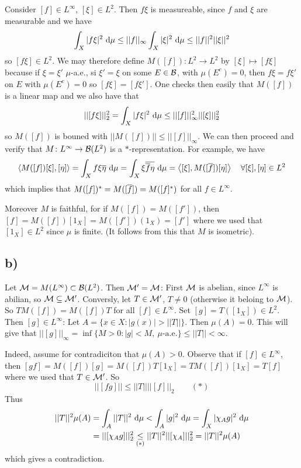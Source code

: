 \documentclass[10pt,english,a4paper]{article}
\theoremstyle{definition}
\def\Linf{L^{\infty}}
\begin{document}
Consider $[f] \in \Linf$, $[\xi] \in L^2$. Then $f\xi$ is measureable, since $f$
and $\xi$ are measurable and we have 
\[ \int_{X} |f\xi|^2 ~\text{d}\mu \leq ||f||_{\infty} \int_{X}|\xi|^2 ~\text{d} \mu 
\leq ||f||^2 ||\xi||^2\]
so $[f\xi] \in L^2$.
We may therefore define $M([f])\colon L^2 \to L^2$ by $[\xi]\mapsto [f\xi]$ 
because if $\xi = \xi'$ $\mu$-a.e., si $\xi'=\xi$ on some $E \in \mathcal{B}$, 
with $\mu(E^c) =0$, then $f\xi = f\xi'$ on $E$ with $\mu(E^c)=0$ so 
$[f\xi] = [f\xi']$. One checks then easily that $M([f])$ is a linear map
and we also have that 
\[
||[f\xi]||_{2}^{2} = \int_{X}|f\xi|^2 ~\text{d} \mu \leq ||[f]||_{\infty}^{2} ||[\xi]||_{2}^{2}
\]
so $M([f])$ is bouned with $||M([f])||\leq ||[f]||_{\infty}$.
We can then proceed and verify that 
$M\colon \Linf \to \Bs(L^2)$ is a $*$-representation. For example,
we have 
\begin{align*}
    \left\langle M([f])[\xi],[\eta] \right\rangle = \int_{X}f\xi\overline{\eta}~\text{d}\mu =
\int_{X}\xi \overline{\overline{f}\eta}~\text{d} \mu = \left\langle [\xi], M([\overline{f}])[\eta] \right\rangle
\quad \forall [\xi],[\eta] \in L^2
\end{align*}
which implies that $M([f])^* = M([\overline{f}]) = M([f]^*)$ for all $f \in \Linf$.

Moreover $M$ is faithful, for if $M([f]) = M([f'])$, then 
$[f] = M([f])[1_{X}] = M([f'])(1_{X})= [f']$
where we used that $[1_{X}] \in L^2$ since $\mu$ is finite.
(It follows from this that $M$ is isometric).

\subsection*{b)}
Let $\Ms = M(\Linf) \subset \Bs(L^2)$. Then $\mathcal{M}' = \mathcal{M}$:
First $\mathcal{M}$ is abelian, since $L^{\infty}$ is abilian, so 
$\mathcal{M} \subseteq\mathcal{M}'$. Conversly, let $T \in \mathcal{M}'$, $T \neq 0$ (otherwise it beloing to $\mathcal{M}$).
So $TM([f]) = M([f])T$  for all $[f] \in L^{\infty}$. 
Set $[g] = T([1_{X}]) \in L^2$. Then $[g] \in L^{\infty}$:
Let $A = \{ x \in X : |g(x)| > ||T|| \}$. Then $\mu(A) = 0$. This will give that 
$||[g]||_{\infty} = \inf\{ M> 0: |g| < M,~ \mu\text{-a.e.} \} \leq ||T|| <\infty$.

Indeed, assume for contradiciton that $\mu(A) > 0$. 
Observe that if $[f] \in L^{\infty}$, then $[gf] = M([f])[g] = M([f])T[1_X] 
= TM([f])[1_{X}] = T[f]$ where we used that $T \in \mathcal{M}'$.
So 
\[||[fg]|| \leq ||T|| ||[f]||_2  \qquad (*)\]
Thus 
\begin{align*}
||T||^2 \mu(A) &= \int_{A}||T||^2~\text{d} \mu 
< \int_{A}|g|^2~\text{d}\mu =\int_{X}|\chi_{A}g|^2 ~\text{d}\mu \\&= ||[\chi_A g]||_{2}^{2}
\underset{(*)}{\leq} ||T||^2 ||[\chi_{A}]||_{2}^{2} = ||T||^2 \mu(A)
\end{align*}
which gives a contradiction. 
\end{document}
